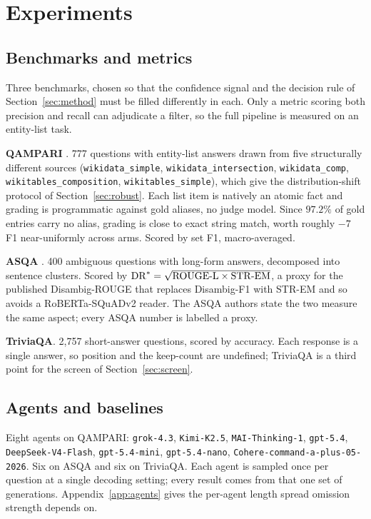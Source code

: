 \documentclass{article}
\begin{document}
\section{Experiments}
\label{sec:experiments}

\subsection{Benchmarks and metrics}
\label{sec:metrics}

Three benchmarks, chosen so that the confidence signal and the decision rule of Section~\ref{sec:method} must be filled differently in each. Only a metric scoring both precision and recall can adjudicate a filter, so the full pipeline is measured on an entity-list task.

\textbf{QAMPARI} \cite{amouyal2022qampari}. 777 questions with entity-list answers drawn from five structurally different sources (\texttt{wikidata\_simple}, \texttt{wikidata\_intersection}, \texttt{wikidata\_comp}, \texttt{wikitables\_composition}, \texttt{wikitables\_simple}), which give the distribution-shift protocol of Section~\ref{sec:robust}.
Each list item is natively an atomic fact and grading is programmatic against gold aliases, no judge model. Since $97.2\%$ of gold entries carry no alias, grading is close to exact string match, worth roughly $-7$ F1 near-uniformly across arms. Scored by set F1, macro-averaged.

\textbf{ASQA} \cite{stelmakh2022asqa}. 400 ambiguous questions with long-form answers, decomposed into sentence clusters. Scored by $\mathrm{DR}^* = \sqrt{\mathrm{ROUGE\text-L} \times \mathrm{STR\text-EM}}$, a proxy for the published Disambig-ROUGE that replaces Disambig-F1 with STR-EM and so avoids a RoBERTa-SQuADv2 reader. The ASQA authors state the two measure the same aspect; every ASQA number is labelled a proxy.

\textbf{TriviaQA}. 2,757 short-answer questions, scored by accuracy. Each response is a single answer, so position and the keep-count are undefined; TriviaQA is a third point for the screen of Section~\ref{sec:screen}.

\subsection{Agents and baselines}

Eight agents on QAMPARI: \texttt{grok-4.3}, \texttt{Kimi-K2.5}, \texttt{MAI-Thinking-1}, \texttt{gpt-5.4}, \texttt{DeepSeek-V4-Flash}, \texttt{gpt-5.4-mini}, \texttt{gpt-5.4-nano}, \texttt{Cohere-command-a-plus-05-2026}. Six on ASQA and six on TriviaQA. %
Each agent is sampled once per question at a single decoding setting; every result comes from that one set of generations. Appendix~\ref{app:agents} gives the per-agent length spread omission strength depends on.
\end{document}
